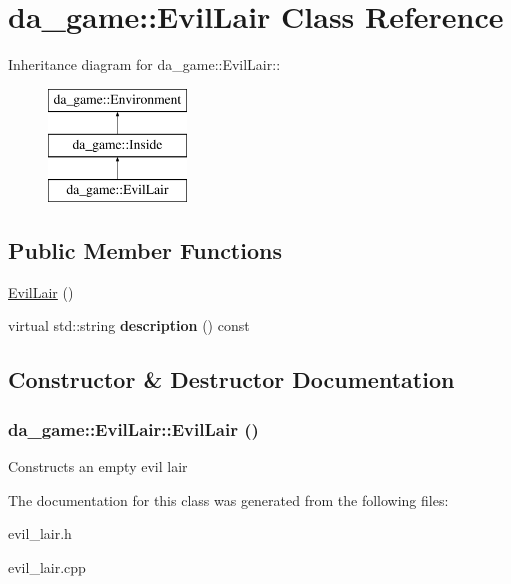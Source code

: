 \hypertarget{classda__game_1_1EvilLair}{
\section{da\_\-game::EvilLair Class Reference}
\label{classda__game_1_1EvilLair}
}
Inheritance diagram for da\_\-game::EvilLair::\begin{figure}[H]
\begin{center}
\leavevmode
\includegraphics[height=3cm]{classda__game_1_1EvilLair}
\end{center}
\end{figure}
\subsection*{Public Member Functions}
\begin{DoxyCompactItemize}
\item 
\hyperlink{classda__game_1_1EvilLair_afe4fe8ac046b4c91ad4e0a0fd4ba7baf}{EvilLair} ()
\item 
\hypertarget{classda__game_1_1EvilLair_adb5a496c651f24ed91e8fdf51c821787}{
virtual std::string {\bfseries description} () const }
\label{classda__game_1_1EvilLair_adb5a496c651f24ed91e8fdf51c821787}

\end{DoxyCompactItemize}


\subsection{Constructor \& Destructor Documentation}
\hypertarget{classda__game_1_1EvilLair_afe4fe8ac046b4c91ad4e0a0fd4ba7baf}{
\subsubsection[{EvilLair}]{\setlength{\rightskip}{0pt plus 5cm}da\_\-game::EvilLair::EvilLair ()}}
\label{classda__game_1_1EvilLair_afe4fe8ac046b4c91ad4e0a0fd4ba7baf}
Constructs an empty evil lair 

The documentation for this class was generated from the following files:\begin{DoxyCompactItemize}
\item 
evil\_\-lair.h\item 
evil\_\-lair.cpp\end{DoxyCompactItemize}
